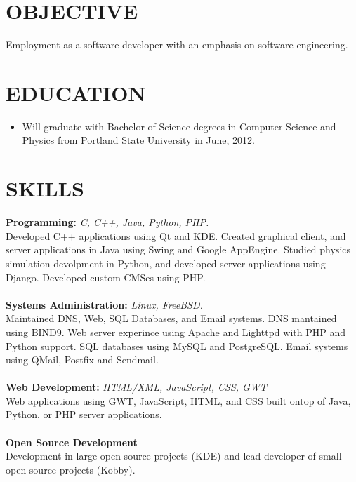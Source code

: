 \documentclass[11pt]{res}
\begin{document}
\address{2030 NW Flanders St. \#103 \\  Portland, OR. 97209 \\  (503) 928-4240 \\  greg@greghaynes.net \\ http://greghaynes.net }

\begin{resume}

\section{OBJECTIVE} Employment as a software developer with an emphasis on software engineering.

\section{EDUCATION} \begin{itemize}
                        \item Will graduate with Bachelor of Science degrees in Computer Science and Physics from Portland State University in June, 2012.
                    \end{itemize}

\section{SKILLS} {\bf Programming:} \textit{C, C++, Java, Python, PHP.} \\
                   Developed C++ applications using Qt and KDE.  Created graphical client, and server applications in Java using Swing and Google AppEngine.  Studied physics simulation devolpment in Python, and developed server applications using Django.  Developed custom CMSes using PHP. \\
                 \\
                 {\bf Systems Administration:} \textit{Linux, FreeBSD.} \\
                   Maintained DNS, Web, SQL Databases, and Email systems. DNS mantained using BIND9.  Web server experince using Apache and Lighttpd with PHP and Python support.  SQL databases using MySQL and PostgreSQL.  Email systems using QMail, Postfix and Sendmail. \\
                 \\
                 {\bf Web Development:} \textit{HTML/XML, JavaScript, CSS, GWT} \\
                 Web applications using GWT, JavaScript, HTML, and CSS built ontop of Java,  Python, or PHP server applications. \\
                 \\
                 {\bf Open Source Development} \\
                 Development in large open source projects (KDE) and lead developer of small open source projects (Kobby).


\end{resume}
\end{document}
